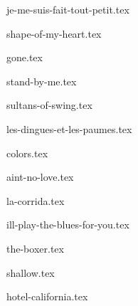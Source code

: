 \begin{songs}{}

  {je-me-suis-fait-tout-petit.tex}
  \sclearpage

  {shape-of-my-heart.tex}
  \sclearpage

  {gone.tex}
  \sclearpage

  {stand-by-me.tex}
  \sclearpage

  {sultans-of-swing.tex}
  \sclearpage

  {les-dingues-et-les-paumes.tex}
  \sclearpage

  {colors.tex}
  \sclearpage

  {aint-no-love.tex}
  \sclearpage

  {la-corrida.tex}
  \sclearpage

  {ill-play-the-blues-for-you.tex}
  \sclearpage

  {the-boxer.tex}
  \sclearpage

  {shallow.tex}
  \sclearpage

  {hotel-california.tex}
  \sclearpage

 \end{songs}
